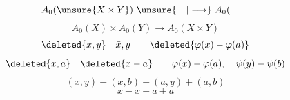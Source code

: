 \[
A_0(\unsure{X\times Y})\ \unsure{\text{---}|\longrightarrow}\ A_0(\qquad
\]
\[
A_0(X)\times A_0(Y)\longrightarrow A_0(X\times Y)
\]
\[
\deleted{x,y}\quad\bar x,y\qquad\deleted{\varphi(x)-\varphi(a)}
\]
\[
\deleted{x,a}\quad\deleted{x-a}\qquad\varphi(x)-\varphi(a),\quad\psi(y)-\psi(b)
\]
\[
(x,y)-(x,b)-(a,y)+(a,b)
\]
\[
x-x-a+a
\]
